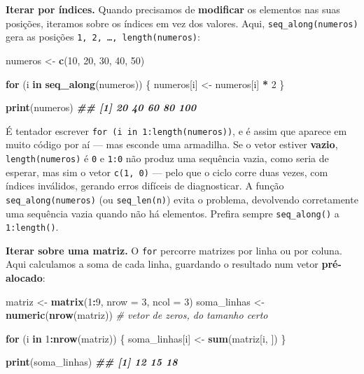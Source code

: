 \documentclass[
  portuguese,
  11pt,
  openany]{book}
\newenvironment{Shaded}{\begin{snugshade}}{\end{snugshade}}
\newcommand{\AttributeTok}[1]{\textcolor[rgb]{0.13,0.29,0.53}{#1}}
\newcommand{\CommentTok}[1]{\textcolor[rgb]{0.56,0.35,0.01}{\textit{#1}}}
\newcommand{\ControlFlowTok}[1]{\textcolor[rgb]{0.13,0.29,0.53}{\textbf{#1}}}
\newcommand{\DecValTok}[1]{\textcolor[rgb]{0.00,0.00,0.81}{#1}}
\newcommand{\DocumentationTok}[1]{\textcolor[rgb]{0.56,0.35,0.01}{\textbf{\textit{#1}}}}
\newcommand{\FunctionTok}[1]{\textcolor[rgb]{0.13,0.29,0.53}{\textbf{#1}}}
\newcommand{\NormalTok}[1]{#1}
\newcommand{\OtherTok}[1]{\textcolor[rgb]{0.56,0.35,0.01}{#1}}
\newcommand{\SpecialCharTok}[1]{\textcolor[rgb]{0.81,0.36,0.00}{\textbf{#1}}}
\begin{document}
\textbf{Iterar por índices.} Quando precisamos de \textbf{modificar} os elementos nas suas
posições, iteramos sobre os índices em vez dos valores. Aqui, \texttt{seq\_along(numeros)}
gera as posições \texttt{1,\ 2,\ …,\ length(numeros)}:

\begin{Shaded}
\begin{Highlighting}[]
\NormalTok{numeros }\OtherTok{\textless{}{-}} \FunctionTok{c}\NormalTok{(}\DecValTok{10}\NormalTok{, }\DecValTok{20}\NormalTok{, }\DecValTok{30}\NormalTok{, }\DecValTok{40}\NormalTok{, }\DecValTok{50}\NormalTok{)}

\ControlFlowTok{for}\NormalTok{ (i }\ControlFlowTok{in} \FunctionTok{seq\_along}\NormalTok{(numeros)) \{}
\NormalTok{  numeros[i] }\OtherTok{\textless{}{-}}\NormalTok{ numeros[i] }\SpecialCharTok{*} \DecValTok{2}
\NormalTok{\}}

\FunctionTok{print}\NormalTok{(numeros)}
\DocumentationTok{\#\# [1]  20  40  60  80 100}
\end{Highlighting}
\end{Shaded}

É tentador escrever \texttt{for\ (i\ in\ 1:length(numeros))}, e é assim que aparece em muito
código por aí --- mas esconde uma armadilha. Se o vetor estiver \textbf{vazio},
\texttt{length(numeros)} é \texttt{0} e \texttt{1:0} não produz uma sequência vazia, como seria de
esperar, mas sim o vetor \texttt{c(1,\ 0)} --- pelo que o ciclo corre duas vezes, com índices
inválidos, gerando erros difíceis de diagnosticar. A função \texttt{seq\_along(numeros)} (ou
\texttt{seq\_len(n)}) evita o problema, devolvendo corretamente uma sequência vazia quando não
há elementos. Prefira sempre \texttt{seq\_along()} a \texttt{1:length()}.

\textbf{Iterar sobre uma matriz.} O \texttt{for} percorre matrizes por linha ou por coluna. Aqui
calculamos a soma de cada linha, guardando o resultado num vetor \textbf{pré-alocado}:

\begin{Shaded}
\begin{Highlighting}[]
\NormalTok{matriz }\OtherTok{\textless{}{-}} \FunctionTok{matrix}\NormalTok{(}\DecValTok{1}\SpecialCharTok{:}\DecValTok{9}\NormalTok{, }\AttributeTok{nrow =} \DecValTok{3}\NormalTok{, }\AttributeTok{ncol =} \DecValTok{3}\NormalTok{)}
\NormalTok{soma\_linhas }\OtherTok{\textless{}{-}} \FunctionTok{numeric}\NormalTok{(}\FunctionTok{nrow}\NormalTok{(matriz))     }\CommentTok{\# vetor de zeros, do tamanho certo}

\ControlFlowTok{for}\NormalTok{ (i }\ControlFlowTok{in} \DecValTok{1}\SpecialCharTok{:}\FunctionTok{nrow}\NormalTok{(matriz)) \{}
\NormalTok{  soma\_linhas[i] }\OtherTok{\textless{}{-}} \FunctionTok{sum}\NormalTok{(matriz[i, ])}
\NormalTok{\}}

\FunctionTok{print}\NormalTok{(soma\_linhas)}
\DocumentationTok{\#\# [1] 12 15 18}
\end{Highlighting}
\end{Shaded}
\end{document}
